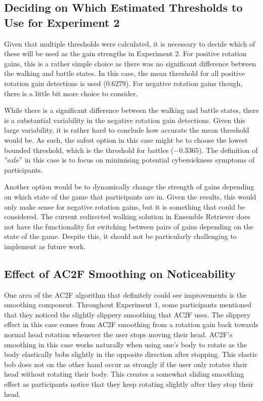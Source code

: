 \subsection{Deciding on Which Estimated Thresholds to Use for Experiment 2}
Given that multiple thresholds were calculated, it is necessary to decide which of these will be used as the gain strengths in Experiment 2. For positive rotation gains, this is a rather simple choice as there was no significant difference between the walking and battle states. In this case, the mean threshold for all positive rotation gain detections is used ($0.6279$). For negative rotation gains though, there is a little bit more choice to consider.

While there is a significant difference between the walking and battle states, there is a substantial variability in the negative rotation gain detections. Given this large variability, it is rather hard to conclude how accurate the mean threshold would be. As such, the safest option in this case might be to choose the lowest bounded threshold, which is the threshold for battles ($-0.3365$). The definition of ''safe'' in this case is to focus on minimising potential cybersickness symptoms of participants. 

Another option would be to dynamically change the strength of gains depending on which state of the game that participants are in. Given the results, this would only make sense for negative rotation gains, but it is something that could be considered. The current redirected walking solution in Ensemble Retriever does not have the functionality for switching between pairs of gains depending on the state of the game. Despite this, it should not be particularly challenging to implement as future work.

\subsection{Effect of AC2F Smoothing on Noticeability}
One area of the AC2F algorithm that definitely could see improvements is the smoothing component. Throughout Experiment 1, some participants mentioned that they noticed the slightly slippery smoothing that AC2F uses. The slippery effect in this case comes from AC2F smoothing from a rotation gain back towards normal head rotation whenever the user stops moving their head. AC2F's smoothing in this case works naturally when using one's body to rotate as the body elastically bobs slightly in the opposite direction after stopping. This elastic bob does not on the other hand occur as strongly if the user only rotates their head without rotating their body. This creates a somewhat sliding smoothing effect as participants notice that they keep rotating slightly after they stop their head. 

